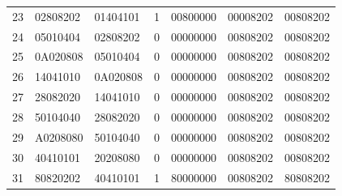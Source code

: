 \begin{longtable}{rllrlll}
23 & 02808202 & 01404101 & 1 & 00800000 & 00008202 & 00808202\\
24 & 05010404 & 02808202 & 0 & 00000000 & 00808202 & 00808202\\
25 & 0A020808 & 05010404 & 0 & 00000000 & 00808202 & 00808202\\
26 & 14041010 & 0A020808 & 0 & 00000000 & 00808202 & 00808202\\
27 & 28082020 & 14041010 & 0 & 00000000 & 00808202 & 00808202\\
28 & 50104040 & 28082020 & 0 & 00000000 & 00808202 & 00808202\\
29 & A0208080 & 50104040 & 0 & 00000000 & 00808202 & 00808202\\
30 & 40410101 & 20208080 & 0 & 00000000 & 00808202 & 00808202\\
31 & 80820202 & 40410101 & 1 & 80000000 & 00808202 & 80808202\\
\bottomrule\end{longtable}\endgroup
